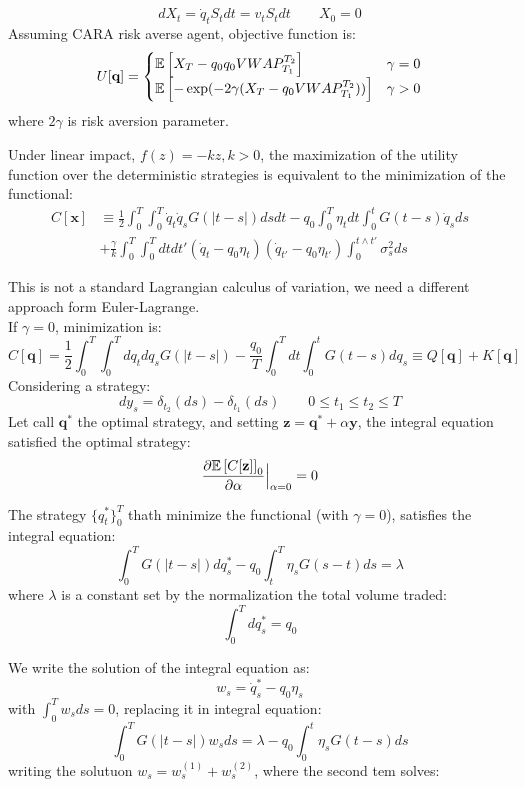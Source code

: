 \[
dX_t = \dot{q}_tS_tdt =v_tS_tdt\qquad X_0=0
\]
Assuming CARA risk averse agent, objective function is:
\[
U[\textbf{q}] = \begin{cases}
	\mathbb{E}\left[X_T - q_0 q_0VWAP_{T_1}^{T_2}\right]& \gamma = 0\\
	\mathbb{E}\left[-\exp(-2\gamma(X_T - q_0VWAP_{T_1}^{T_2}))\right] &\gamma >0
\end{cases}
\]
where $2\gamma$ is risk aversion parameter.
\begin{mytheorem}
	Under linear impact, $f(z) = -kz, k>0$, the maximization of the utility function over the deterministic strategies is equivalent to the minimization of the functional:
	\begin{align}
	C[\mathbf{x}]&\equiv \frac{1}{2} \int_{0}^{T} \int_0^T \dot{q}_t \dot{q}_s G(|t-s|)dsdt - q_0 \int_0^T \eta_t dt \int_0^t G(t-s) \dot{q}_s ds\\
	& + \frac{\gamma}{k}\int_0^T\int_0^T dt dt'(\dot{q}_t - q_0\eta_t)(\dot{q}_{t'} -q_0\eta_{t'})\int_0^{t \land t'} \sigma^2_sds
	\end{align}
\end{mytheorem}
This is not a standard Lagrangian calculus of variation, we need a different approach form Euler-Lagrange.\\
If $\gamma =0$, minimization is:
\[
C[\textbf{q}] = \frac{1}{2} \int_0^T \int_0^T dq_tdq_s G(|t-s|) - \frac{q_0}{T}\int_0^T dt \int_0^t G(t-s)dq_s \equiv Q[\textbf{q}] + K[\textbf{q}]
\]
Considering a strategy:
\[
dy_s = \delta_{t_2}(ds) - \delta_{t_1}(ds) \qquad 0\leq t_1 \leq t_2 \leq T
\]
Let call $\textbf{q}^*$ the optimal strategy, and setting $\textbf{z} = \textbf{q}^* + \alpha \textbf{y}$, the integral equation satisfied the optimal strategy:
\[
\frac{\partial \mathbb{E}\left[C[\textbf{z}]\right]_0}{\partial \alpha}\Bigr|_{\alpha = 0} = 0
\]
\begin{mytheorem}
	The strategy $\{q_t^*\}^T_0$ thath minimize the functional (with $\gamma = 0$), satisfies the integral equation:
	\[
	\int_0^T G(|t-s|)dq^*_s - q_0 \int_t^T \eta_s G(s-t)ds = \lambda
	\]
where $\lambda$ is a constant set by the normalization the total volume traded:
\[
\int_0^T dq^*_s = q_0
\]
\end{mytheorem}
We write the solution of the integral equation as:
\[
w_s = \dot{q}_s^* - q_0\eta_s
\]
with $\int_0^T w_sds=0$, replacing it in integral equation:
\[
\int_0^T G(|t-s|) w_sds = \lambda - q_0 \int_0^t \eta_sG(t-s)ds
\]
writing the solutuon $w_s = w_s^{(1)} + w_s^{(2)}$, where the second tem solves:
